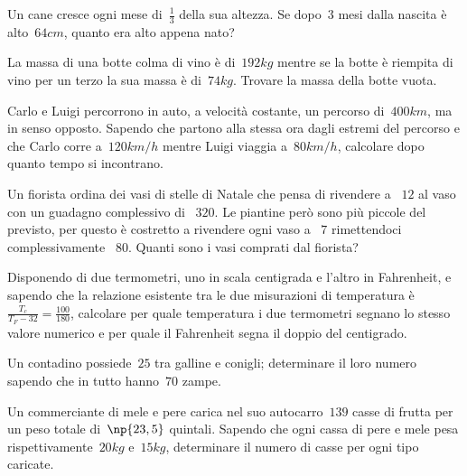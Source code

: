 \begin{multicols}{2}
\begin{esercizio}[\Ast, \croce]
\label{ese:16.84}
Un cane cresce ogni mese di~$\frac{1}{3}$ della sua altezza. Se dopo~$3$ mesi dalla nascita è alto~$64\unit{cm}$, quanto era alto appena nato?
\end{esercizio}

\begin{esercizio}[\Ast, \croce]
\label{ese:16.85}
La massa di una botte colma di vino è di~$192\unit{kg}$ mentre se la botte è riempita di vino per un terzo la sua massa è di~$74\unit{kg}$. Trovare la massa della botte vuota.
\end{esercizio}

\begin{esercizio}[\Ast, \croce]
\label{ese:16.86}
Carlo e Luigi percorrono in auto, a velocità costante, un percorso di~$400\unit{km}$, ma in senso opposto. Sapendo che partono alla stessa ora dagli estremi del percorso e che Carlo corre a~$120\unit{km/h}$ mentre Luigi viaggia a~$80\unit{km/h}$, calcolare dopo quanto tempo si incontrano.
\end{esercizio}

\begin{esercizio}[\Ast, \croce]
\label{ese:16.87}
Un fiorista ordina dei vasi di stelle di Natale che pensa di rivendere a \officialeuro~$12$ al vaso con un guadagno complessivo di \officialeuro~$320$. Le piantine però sono più piccole del previsto, per questo è costretto a rivendere ogni vaso a \officialeuro~$7$ rimettendoci complessivamente \officialeuro~$80$. Quanti sono i vasi comprati dal fiorista?
\end{esercizio}

\begin{esercizio}[\Ast]
\label{ese:16.88}
Disponendo di due termometri, uno in scala centigrada e l'altro in Fahrenheit, e sapendo che la relazione esistente tra le due misurazioni di temperatura è~$\frac{T_c}{T_F-32}=\frac{100}{180}$, calcolare per quale temperatura i due termometri segnano lo stesso valore numerico e per quale il Fahrenheit segna il doppio del centigrado.
\end{esercizio}

\begin{esercizio}[\Ast, \croce]
\label{ese:16.89}
Un contadino possiede~$25$ tra galline e conigli; determinare il loro numero sapendo che in tutto hanno~$70$ zampe.
\end{esercizio}

\begin{esercizio}[\Ast, \croce]
\label{ese:16.90}
Un commerciante di mele e pere carica nel suo autocarro~$139$ casse di frutta per un peso totale di~$\np{23,5}$ quintali. Sapendo che ogni cassa di pere e mele pesa rispettivamente~$20\unit{kg}$ e~$15\unit{kg}$, determinare il numero di casse per ogni tipo caricate.
\end{esercizio}


\end{multicols}
